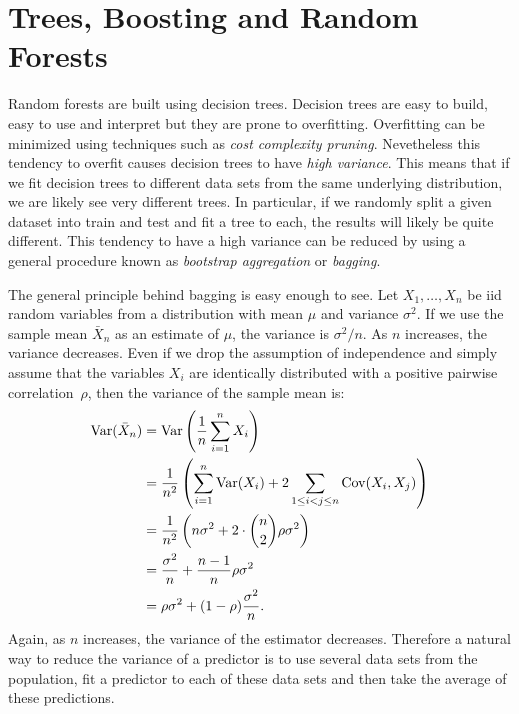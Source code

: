 \chapter{Trees, Boosting and Random Forests}

Random forests are built using decision trees. Decision trees are easy to 
build, easy to use and interpret but they are prone to overfitting. 
Overfitting can be minimized using techniques such as \emph{cost complexity 
pruning}. Nevetheless this tendency to overfit causes decision trees to have 
\emph{high variance}. This means that if we fit decision trees to different 
data sets from the same underlying distribution, we are likely see very different
trees. In particular, if we randomly split a given dataset into train and test
and fit a tree to each, the results will likely be quite different. This tendency 
to have a high variance can be reduced by using a general procedure known 
as \emph{bootstrap aggregation} or \emph{bagging}.

The general principle behind bagging is easy enough to see. Let 
$X_1, \ldots, X_n$ be iid random variables from a distribution with mean $\mu$
and variance $\sigma^2$. If we use the sample mean $\bar{X}_n$ as an estimate 
of $\mu$, the variance is $\sigma^2 / n$. As $n$ increases, the variance 
decreases. Even if we drop the assumption of independence and simply assume 
that the variables $X_i$ are identically distributed with a positive pairwise 
correlation~$\rho$, then the variance of the sample mean is:
\begin{align*}
    \operatorname{Var} (\bar{X}_n) & = \operatorname{Var} \left ( \frac{1}{n} \sum_{i = 1}^{n} X_i \right ) \\
                     & = \frac{1}{n^2} \left ( \sum_{i = 1}^{n} \operatorname{Var} (X_i) + 2 \sum_{1 \leq i < j \leq n} \operatorname{Cov} (X_i, X_j)\right ) \\
                     & = \frac{1}{n^2} \left ( n \sigma^2 + 2 \cdot {n \choose 2} \rho \sigma^2 \right ) \\
                     & = \frac{\sigma^2}{n} + \frac{n - 1}{n} \rho \sigma^2 \\
                     & = \rho \sigma^2 + (1 - \rho) \frac{\sigma^2}{n}.
\end{align*}
Again, as $n$ increases, the variance of the estimator decreases. Therefore a 
natural way to reduce the variance of a predictor is to use several data sets 
from the population, fit a predictor to each of these data sets and then take 
the average of these predictions.

